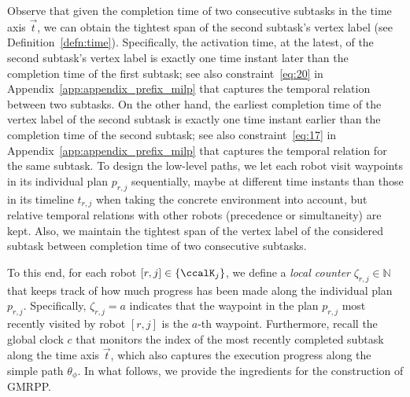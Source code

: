 \documentclass[Afour,sageh,times]{sagej}
\newcommand{\auto}[1]{\ccalA_{\textup{#1}}}
\newcommand{\autop}{\ccalA_{\phi}}
\newcommand{\domanda}[1]{\subsubsection*{#1}}
\begin{document}
{{ {Observe that given the completion time of two consecutive subtasks in the time axis $\vec{t}$, we can obtain the tightest span of the second subtask's vertex label (see Definition~\ref{defn:time}). Specifically, the activation time, at the latest, of the second subtask's vertex label is exactly one time instant later than the completion time of the first subtask; see also constraint~\eqref{eq:20} in Appendix~\ref{app:appendix_prefix_milp} that captures the temporal relation between two subtasks. On the other hand, the earliest completion time of the vertex label of the second subtask is exactly one time instant earlier than the completion time of the second subtask; see also constraint~\eqref{eq:17} in Appendix~\ref{app:appendix_prefix_milp} that captures the temporal relation for the same subtask.  To design the low-level paths,  we let each robot visit waypoints in its individual plan $p_{r,j}$ sequentially, maybe at different time instants than those in its timeline $t_{r,j}$ when taking the concrete environment into account, but relative temporal relations with other robots (precedence or simultaneity) are kept. Also, we maintain the tightest span of the vertex label of the considered subtask between completion time of two consecutive subtasks.}



 To this end, for each robot $[r,j] \in \{\ccalK_j\}$, we define a {\it local counter} $\zeta_{r,j} \in \mathbb{N}$  that  keeps track of how much progress has been made along the individual plan $p_{r,j}$. Specifically, $\zeta_{r,j} = a$ indicates that the waypoint in the plan $p_{r,j}$ most recently visited by  robot $[r,j]$ is the $a$-th waypoint. Furthermore, recall the  global clock $c$ that monitors the index of the most recently completed subtask  along the time axis $\vec{t}$, which also captures the execution progress along the simple path  $\theta_{\phi}$. In what follows, we provide the ingredients for the construction of GMRPP.


}}
\end{document}
